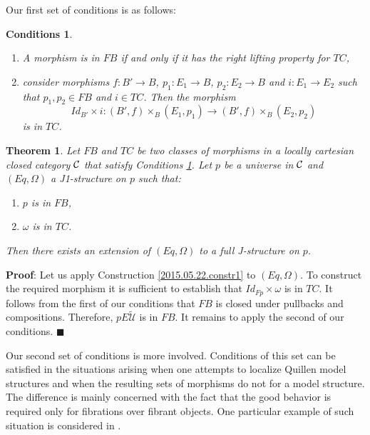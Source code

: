 \documentclass[12pt]{article}
\numberwithin{equation}{section}
\newenvironment{myproof}{{\bf Proof}:}{$\blacksquare$ \vskip 5mm }
\newtheorem{theorem}[proposition]{Theorem}
\newtheorem{cond}[proposition]{Conditions}
\newcommand{\llabel}[1]{\label{#1}}
\newcommand{\sr}{\rightarrow}
\newcommand{\wt}{\widetilde}
\newcommand{\U}{\mathcal{U}}
\begin{document}
Our first set of conditions is as follows:
%
\begin{cond}\llabel{2015.05.22.cond2}
\begin{enumerate}
\item A morphism is in $FB$ if and only if it has the right lifting property
  for $TC$,
\item consider morphisms $f: B'\sr B$, $p_1:E_1\sr B$, $p_2:E_2\sr B$ and
  $i:E_1\sr E_2$ such that $p_1,p_2\in FB$ and $i\in TC$. Then the morphism
%
$$Id_{B'}\times i: (B',f)\times_B(E_1,p_1)\sr (B',f)\times_B(E_2,p_2)$$
%
is in $TC$.
\end{enumerate}
\end{cond}
%
\begin{theorem}
\llabel{2015.05.22.th1} Let $FB$ and $TC$ be two classes of morphisms in a
locally cartesian closed category $\cal C$ that satisfy Conditions
\ref{2015.05.22.cond2}. Let $p$ be a universe in $\cal C$ and $(Eq,\Omega)$ a
J1-structure on $p$ such that:
%
\begin{enumerate}
\item $p$ is in $FB$,
\item $\omega$ is in $TC$.
\end{enumerate}
%
Then there exists an extension of $(Eq,\Omega)$ to a full J-structure on $p$.
\end{theorem}
%
\begin{myproof}
Let us apply Construction \ref{2015.05.22.constr1} to $(Eq,\Omega)$. To
construct the required morphism it is sufficient to establish that
$Id_{Fp}\times\omega$ is in $TC$. It follows from the first of our conditions
that $FB$ is closed under pullbacks and compositions. Therefore, $pE\wt{\U}$ is
in $FB$. It remains to apply the second of our conditions.
\end{myproof}
% 





Our second set of conditions is more involved. Conditions of this set can be
satisfied in the situations arising when one attempts to localize Quillen model
structures and when the resulting sets of morphisms do not for a model
structure. The difference is mainly concerned with the fact that the good
behavior is required only for fibrations over fibrant objects. One particular
example of such situation is considered in \cite[Section 3.3]{SRF}.
\end{document}
